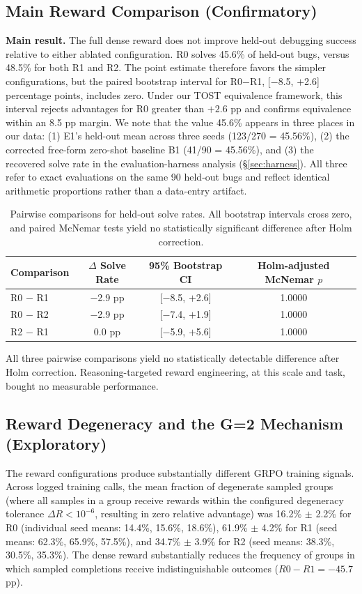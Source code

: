 \documentclass{article}
\begin{document}
\subsection{Main Reward Comparison (Confirmatory)}
\textbf{Main result.} The full dense reward does not improve held-out debugging success relative to either ablated configuration. R0 solves 45.6\% of held-out bugs, versus 48.5\% for both R1 and R2. The point estimate therefore favors the simpler configurations, but the paired bootstrap interval for R0$-$R1, [$-$8.5, $+$2.6] percentage points, includes zero. Under our TOST equivalence framework, this interval rejects advantages for R0 greater than $+2.6$ pp and confirms equivalence within an 8.5 pp margin. We note that the value 45.6\% appears in three places in our data: (1) E1's held-out mean across three seeds (123/270 = 45.56\%), (2) the corrected free-form zero-shot baseline B1 (41/90 = 45.56\%), and (3) the recovered solve rate in the evaluation-harness analysis (§\ref{sec:harness}). All three refer to exact evaluations on the same 90 held-out bugs and reflect identical arithmetic proportions rather than a data-entry artifact.

\begin{table}[h]
\centering
\small
\begin{tabular}{l c c c}
\toprule
\textbf{Comparison} & \textbf{$\Delta$ Solve Rate} & \textbf{95\% Bootstrap CI} & \textbf{Holm-adjusted McNemar $p$} \\
\midrule
R0 $-$ R1 & $-$2.9 pp & [$-$8.5, $+$2.6] & 1.0000 \\
R0 $-$ R2 & $-$2.9 pp & [$-$7.4, $+$1.9] & 1.0000 \\
R2 $-$ R1 & 0.0 pp & [$-$5.9, $+$5.6] & 1.0000 \\
\bottomrule
\end{tabular}
\caption{Pairwise comparisons for held-out solve rates. All bootstrap intervals cross zero, and paired McNemar tests yield no statistically significant difference after Holm correction.}
\label{tab:pairwise}
\end{table}

All three pairwise comparisons yield no statistically detectable difference after Holm correction. Reasoning-targeted reward engineering, at this scale and task, bought no measurable performance.

\subsection{Reward Degeneracy and the G=2 Mechanism (Exploratory)}
The reward configurations produce substantially different GRPO training signals. Across logged training calls, the mean fraction of degenerate sampled groups (where all samples in a group receive rewards within the configured degeneracy tolerance $\Delta R < 10^{-6}$, resulting in zero relative advantage) was 16.2\% $\pm$ 2.2\% for R0 (individual seed means: 14.4\%, 15.6\%, 18.6\%), 61.9\% $\pm$ 4.2\% for R1 (seed means: 62.3\%, 65.9\%, 57.5\%), and 34.7\% $\pm$ 3.9\% for R2 (seed means: 38.3\%, 30.5\%, 35.3\%). The dense reward substantially reduces the frequency of groups in which sampled completions receive indistinguishable outcomes ($R0 - R1 = -45.7$ pp).
\end{document}
